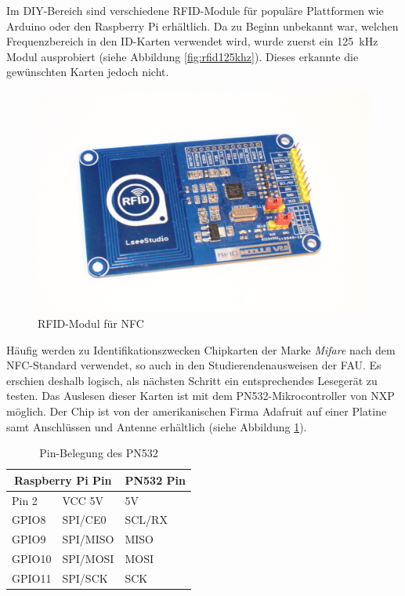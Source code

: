 \documentclass[11pt,a4paper]{IEEEtran}
\begin{document}
Im DIY-Bereich sind verschiedene RFID-Module für populäre Plattformen wie
Arduino oder den Raspberry Pi erhältlich. Da zu Beginn unbekannt war, welchen
Frequenzbereich in den ID-Karten verwendet wird, wurde zuerst ein 
\SI{125}{\kilo\hertz} Modul ausprobiert (siehe Abbildung \ref{fig:rfid125khz}).
Dieses erkannte die gewünschten Karten jedoch nicht. 

\begin{figure}[ht]
    \centering
    \includegraphics[width=.8\columnwidth]{images/nfc_reader}
    \caption{RFID-Modul für NFC}
    \label{fig:rfidnfc}
\end{figure}

Häufig werden zu Identifikationszwecken Chipkarten der Marke \emph{Mifare} nach
dem NFC-Standard verwendet, so auch in den Studierendenausweisen der
FAU\autocite{FauCARD}. Es erschien deshalb logisch, als nächsten Schritt ein
entsprechendes Lesegerät zu testen. Das Auslesen dieser Karten ist mit dem
PN532-Mikrocontroller von NXP möglich. Der Chip ist von der amerikanischen
Firma Adafruit\autocite{AdafruitHP} auf einer Platine samt Anschlüssen und
Antenne erhältlich (siehe Abbildung \ref{fig:rfidnfc}).

\begin{table}[!ht]
    \centering
    \begin{tabular}{ll|l}
        \multicolumn{2}{c}{Raspberry Pi Pin} & PN532 Pin \\
        \hline\hline
        Pin 2   & VCC 5V & 5V  \\
        GPIO8   & SPI/CE0 & SCL/RX \\
        GPIO9   & SPI/MISO & MISO \\
        GPIO10  & SPI/MOSI & MOSI \\
        GPIO11  & SPI/SCK & SCK \\
        \hline
    \end{tabular}
    \caption{Pin-Belegung des PN532}
    \label{tab:pn532pins}
\end{table}
\end{document}
